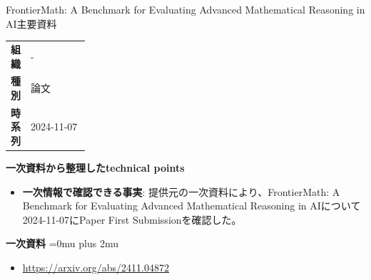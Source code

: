 \begin{technicalnote}{FrontierMath: A Benchmark for Evaluating Advanced Mathematical Reasoning in AI}{主要資料}
\begingroup
\begin{tabularx}{\linewidth}{@{}>{\bfseries}p{0.22\linewidth}X@{}}
組織 & - \\
種別 & 論文 \\
時系列 & 2024-11-07 \\
\end{tabularx}
\smallskip
{\bfseries 一次資料から整理したtechnical points}
\begin{itemize}[leftmargin=1.5em,itemsep=0.35em]
\item \textbf{一次情報で確認できる事実}: 提供元の一次資料により、FrontierMath: A Benchmark for Evaluating Advanced Mathematical Reasoning in AIについて2024-11-07にPaper First Submissionを確認した。
\end{itemize}
\begin{minipage}{\linewidth}
\begin{samepage}
{\bfseries 一次資料}
\begingroup\sloppy
\Urlmuskip=0mu plus 2mu\relax
\begin{itemize}[leftmargin=1.5em,itemsep=0.25em]
\item {\scriptsize\url{https://arxiv.org/abs/2411.04872}}
\end{itemize}
\endgroup
\end{samepage}
\end{minipage}
\endgroup
\end{technicalnote}
\medskip

